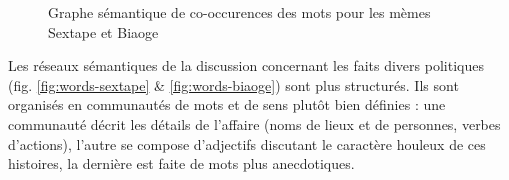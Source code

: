 \begin{figure}[ht]
    \centering
    
  \caption{
    Graphe s\'emantique de co-occurences des mots pour les m\`emes Sextape et Biaoge
  }
\end{figure}


Les r\'eseaux s\'emantiques de la discussion concernant les faits divers politiques (fig. \ref{fig:words-sextape} \& \ref{fig:words-biaoge}) sont plus structur\'es. Ils sont organis\'es en communaut\'es de mots et de sens plut\^ot bien d\'efinies : une communaut\'e d\'ecrit les d\'etails de l{\textquoteright}affaire (noms de lieux et de personnes, verbes d{\textquoteright}actions), l{\textquoteright}autre se compose d{\textquoteright}adjectifs discutant le caract\`ere houleux de ces histoires, la derni\`ere est faite de mots plus anecdotiques.

